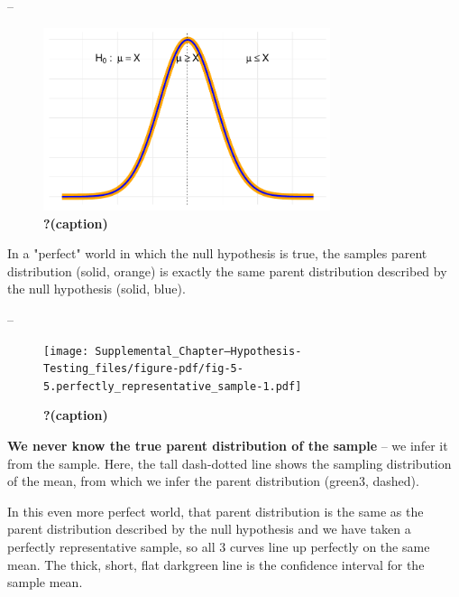\documentclass[
  letterpaper,
  DIV=11,
  numbers=noendperiod]{scrartcl}
\begin{document}
--

\begin{figure}

{\centering \includegraphics[width=0.75\textwidth,height=\textheight]{Supplemental_Chapter---Hypothesis-Testing_files/figure-pdf/fig-5-5.null_identical_sample-1.pdf}

}

\caption{\label{fig-5-5.null_identical_sample}\textbf{?(caption)}}

\end{figure}

In a "perfect" world in which the null hypothesis is true, the
sample\textquotesingle s parent distribution (solid, orange) is exactly
the same parent distribution described by the null hypothesis (solid,
blue).

--

\begin{figure}

{\centering \texttt{[image: Supplemental\_Chapter---Hypothesis-Testing\_files/figure-pdf/fig-5-5.perfectly\_representative\_sample-1.pdf]}

}

\caption{\label{fig-5-5.perfectly_representative_sample}\textbf{?(caption)}}

\end{figure}

\textbf{We never know the true parent distribution of the sample} -- we
infer it from the sample. Here, the tall dash-dotted line shows the
sampling distribution of the mean, from which we infer the parent
distribution (green3, dashed).

In this even more perfect world, that parent distribution is the same as
the parent distribution described by the null hypothesis and we have
taken a perfectly representative sample, so all 3 curves line up
perfectly on the same mean. The thick, short, flat darkgreen line is the
confidence interval for the sample mean.
\end{document}
